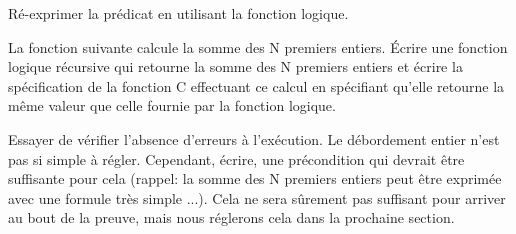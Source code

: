 

Ré-exprimer la prédicat  en utilisant la fonction logique.



\label{l4:acsl-properties-functions-n-first-ints}


La fonction suivante calcule la somme des N premiers entiers. Écrire une fonction
logique récursive qui retourne la somme des N premiers entiers et écrire
la spécification de la fonction C effectuant ce calcul en spécifiant qu'elle
retourne la même valeur que celle fournie par la fonction logique.




Essayer de vérifier l'absence d'erreurs à l'exécution. Le débordement entier
n'est pas si simple à régler. Cependant, écrire, une précondition qui devrait
être suffisante pour cela (rappel: la somme des N premiers entiers peut être
exprimée avec une formule très simple ...). Cela ne sera sûrement pas suffisant
pour arriver au bout de la preuve, mais nous réglerons cela dans la prochaine
section.
